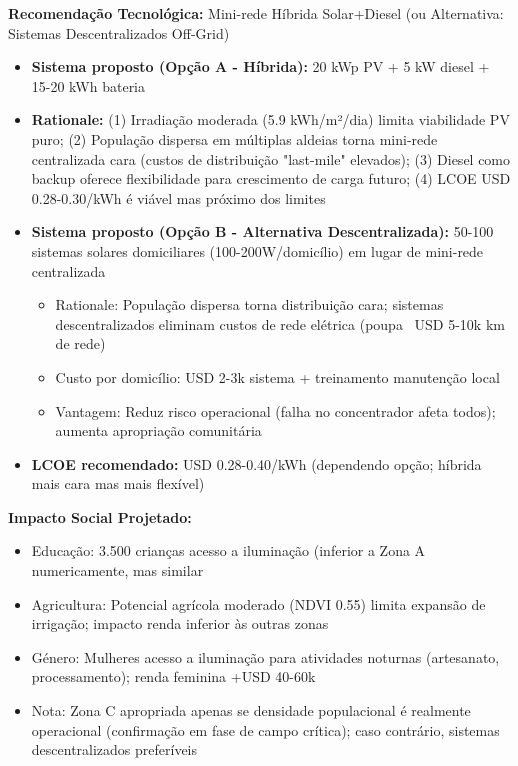 \documentclass[12pt, a4paper]{article}
\begin{document}
\textbf{Recomendação Tecnológica:}
Mini-rede Híbrida Solar+Diesel (ou Alternativa: Sistemas Descentralizados Off-Grid)
\begin{itemize}
\item \textbf{Sistema proposto (Opção A - Híbrida):} 20 kWp PV + 5 kW diesel + 15-20 kWh bateria
\item \textbf{Rationale:} (1) Irradiação moderada (5.9 kWh/m²/dia) limita viabilidade PV puro; (2) População dispersa em múltiplas aldeias torna mini-rede centralizada cara (custos de distribuição "last-mile" elevados); (3) Diesel como backup oferece flexibilidade para crescimento de carga futuro; (4) LCOE USD 0.28-0.30/kWh é viável mas próximo dos limites
\item \textbf{Sistema proposto (Opção B - Alternativa Descentralizada):} 50-100 sistemas solares domiciliares (100-200W/domicílio) em lugar de mini-rede centralizada
  \begin{itemize}
  \item Rationale: População dispersa torna distribuição cara; sistemas descentralizados eliminam custos de rede elétrica (poupa ~USD 5-10k km de rede)
  \item Custo por domicílio: USD 2-3k sistema + treinamento manutenção local
  \item Vantagem: Reduz risco operacional (falha no concentrador afeta todos); aumenta apropriação comunitária
  \end{itemize}
\item \textbf{LCOE recomendado:} USD 0.28-0.40/kWh (dependendo opção; híbrida mais cara mas mais flexível)
\end{itemize}

\textbf{Impacto Social Projetado:}
\begin{itemize}
\item Educação: 3.500 crianças acesso a iluminação (inferior a Zona A numericamente, mas similar %
\item Agricultura: Potencial agrícola moderado (NDVI 0.55) limita expansão de irrigação; impacto renda inferior às outras zonas
\item Género: Mulheres acesso a iluminação para atividades noturnas (artesanato, processamento); renda feminina +USD 40-60k
\item Nota: Zona C apropriada apenas se densidade populacional é realmente operacional (confirmação em fase de campo crítica); caso contrário, sistemas descentralizados preferíveis
\end{itemize}
\end{document}
